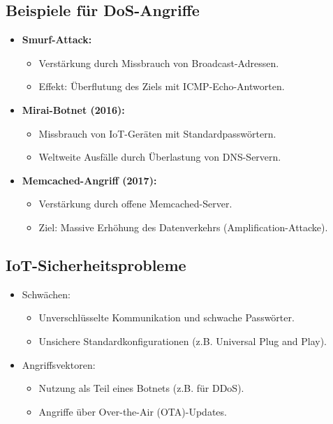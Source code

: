\documentclass{article}
\begin{document}
\subsection{Beispiele für DoS-Angriffe}
\begin{itemize}
    \item \textbf{Smurf-Attack:}
    \begin{itemize}
        \item Verstärkung durch Missbrauch von Broadcast-Adressen.
        \item Effekt: Überflutung des Ziels mit ICMP-Echo-Antworten.
    \end{itemize}
    \item \textbf{Mirai-Botnet (2016):}
    \begin{itemize}
        \item Missbrauch von IoT-Geräten mit Standardpasswörtern.
        \item Weltweite Ausfälle durch Überlastung von DNS-Servern.
    \end{itemize}
    \item \textbf{Memcached-Angriff (2017):}
    \begin{itemize}
        \item Verstärkung durch offene Memcached-Server.
        \item Ziel: Massive Erhöhung des Datenverkehrs (Amplification-Attacke).
    \end{itemize}
\end{itemize}

\subsection{IoT-Sicherheitsprobleme}
\begin{itemize}
    \item Schwächen:
    \begin{itemize}
        \item Unverschlüsselte Kommunikation und schwache Passwörter.
        \item Unsichere Standardkonfigurationen (z.B. Universal Plug and Play).
    \end{itemize}
    \item Angriffsvektoren:
    \begin{itemize}
        \item Nutzung als Teil eines Botnets (z.B. für DDoS).
        \item Angriffe über Over-the-Air (OTA)-Updates.
    \end{itemize}
\end{itemize}
\end{document}
